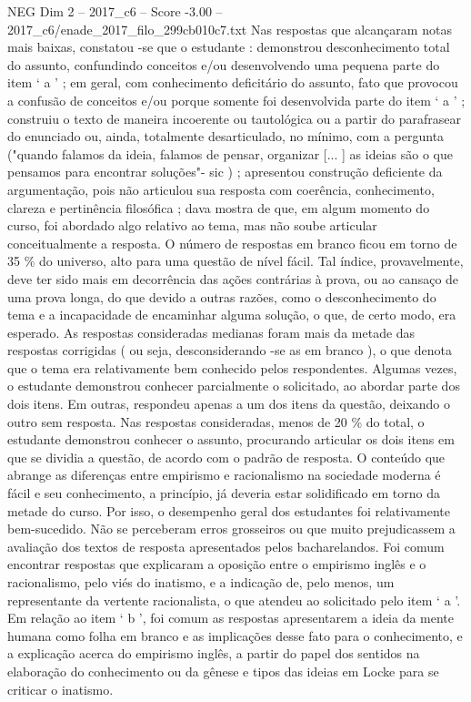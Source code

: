 \begin{textsample}{NEG Dim 2 – 2017\_c6 – Score -3.00 – 2017\_c6/enade\_2017\_filo\_299cb010c7.txt}
Nas respostas que alcançaram notas mais baixas, constatou -se que o estudante : demonstrou desconhecimento total do assunto, confundindo conceitos e/ou desenvolvendo uma pequena parte do item ‘ a ’ ; em geral, com conhecimento deficitário do assunto, fato que provocou a confusão de conceitos e/ou porque somente foi desenvolvida parte do item ‘ a ’ ; construiu o texto de maneira incoerente ou tautológica ou a partir do parafrasear do enunciado ou, ainda, totalmente desarticulado, no mínimo, com a pergunta ("quando falamos da ideia, falamos de pensar, organizar [... ] as ideias são o que pensamos para encontrar soluções"- sic ) ; apresentou construção deficiente da argumentação, pois não articulou sua resposta com coerência, conhecimento, clareza e pertinência filosófica ; dava mostra de que, em algum momento do curso, foi abordado algo relativo ao tema, mas não soube articular conceitualmente a resposta.
O número de respostas em branco ficou em torno de 35 \% do universo, alto para uma questão de nível fácil.
Tal índice, provavelmente, deve ter sido mais em decorrência das ações contrárias à prova, ou ao cansaço de uma prova longa, do que devido a outras razões, como o desconhecimento do tema e a incapacidade de encaminhar alguma solução, o que, de certo modo, era esperado.
As respostas consideradas medianas foram mais da metade das respostas corrigidas ( ou seja, desconsiderando -se as em branco ), o que denota que o tema era relativamente bem conhecido pelos respondentes.
Algumas vezes, o estudante demonstrou conhecer parcialmente o solicitado, ao abordar parte dos dois itens.
Em outras, respondeu apenas a um dos itens da questão, deixando o outro sem resposta.
Nas respostas consideradas, menos de 20 \% do total, o estudante demonstrou conhecer o assunto, procurando articular os dois itens em que se dividia a questão, de acordo com o padrão de resposta.
O conteúdo que abrange as diferenças entre empirismo e racionalismo na sociedade moderna é fácil e seu conhecimento, a princípio, já deveria estar solidificado em torno da metade do curso.
Por isso, o desempenho geral dos estudantes foi relativamente bem-sucedido.
Não se perceberam erros grosseiros ou que muito prejudicassem a avaliação dos textos de resposta apresentados pelos bacharelandos.
Foi comum encontrar respostas que explicaram a oposição entre o empirismo inglês e o racionalismo, pelo viés do inatismo, e a indicação de, pelo menos, um representante da vertente racionalista, o que atendeu ao solicitado pelo item ‘ a ’.
Em relação ao item ‘ b ’, foi comum as respostas apresentarem a ideia da mente humana como folha em branco e as implicações desse fato para o conhecimento, e a explicação acerca do empirismo inglês, a partir do papel dos sentidos na elaboração do conhecimento ou da gênese e tipos das ideias em Locke para se criticar o inatismo.

\end{textsample}
